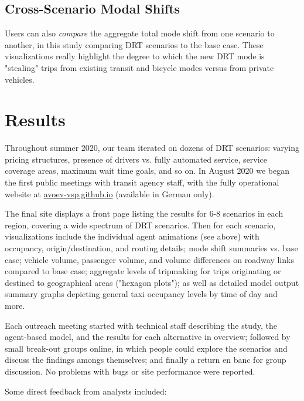 \subsection{Cross-Scenario Modal Shifts}

Users can also \emph{compare} the aggregate total mode shift from one scenario to another, in this study comparing DRT scenarios to the base case. These visualizations really highlight the degree to which the new DRT mode is "stealing" trips from existing transit and bicycle modes versus from private vehicles.


\section{Results}
\label{results}

Throughout summer 2020, our team iterated on dozens of DRT scenarios: varying pricing structures, presence of drivers vs. fully automated service, service coverage areas, maximum wait time goals, and so on. In August 2020 we began the first public meetings with transit agency staff, with the fully operational website at \href{https://avoev-vsp.github.io}{avoev-vsp.github.io} (available in German only).

The final site displays a front page listing the results for 6-8 scenarios in each region, covering a wide spectrum of DRT scenarios. Then for each scenario, visualizations include the individual agent animations (see above) with occupancy, origin/destination, and routing details; mode shift summaries vs. base case; vehicle volume, passenger volume, and volume differences on roadway links compared to base case; aggregate levels of tripmaking for trips originating or destined to geographical areas ("hexagon plots"); as well as detailed model output summary graphs depicting general taxi occupancy levels by time of day and more.

Each outreach meeting started with technical staff describing the study, the agent-based model, and the results for each alternative in overview; followed by small break-out groups online, in which people could explore the scenarios and discuss the findings amongs themselves; and finally a return en banc for group discussion. No problems with bugs or site performance were reported.

Some direct feedback from analysts included:

